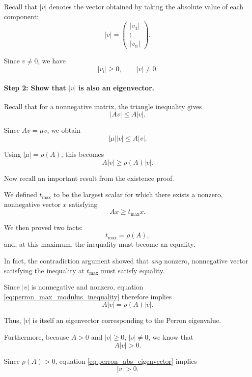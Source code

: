 \documentclass[11pt,a4paper]{article}
\theoremstyle{definition}
\theoremstyle{remark}
\begin{document}
Recall that $|v|$ denotes the vector
obtained by taking the absolute value
of each component:
\[
|v|=
\begin{pmatrix}
|v_1|\\
\vdots\\
|v_n|
\end{pmatrix}.
\]

Since $v\neq0$, we have
\[
|v_i|\geq0,
\qquad
|v|\neq0.
\]


\paragraph{Step 2: Show that $|v|$
is also an eigenvector.}

Recall that for a nonnegative matrix,
the triangle inequality gives
\[
|Av|\leq A|v|.
\]

Since $Av=\mu v$, we obtain
\[
|\mu||v|\leq A|v|.
\]

Using $|\mu|=\rho(A)$,
this becomes
\begin{equation}
A|v|\geq\rho(A)|v|.
\label{eq:perron_max_modulus_inequality}
\end{equation}

Now recall an important result
from the existence proof.

We defined $t_{\max}$ to be the
largest scalar for which there exists
a nonzero, nonnegative vector $x$
satisfying
\[
Ax\geq t_{\max}x.
\]

We then proved two facts:
\[
t_{\max}=\rho(A),
\]
and, at this maximum, the inequality
must become an equality.

In fact, the contradiction argument
showed that \emph{any} nonzero,
nonnegative vector satisfying the
inequality at $t_{\max}$ must
satisfy equality.

Since $|v|$ is nonnegative and
nonzero, equation
\eqref{eq:perron_max_modulus_inequality}
therefore implies
\begin{equation}
\boxed{
A|v|=\rho(A)|v|.
}
\label{eq:perron_abs_eigenvector}
\end{equation}

Thus, $|v|$ is itself an eigenvector
corresponding to the Perron eigenvalue.

Furthermore, because $A>0$ and
$|v|\geq0$, $|v|\neq0$, we know that
\[
A|v|>0.
\]

Since $\rho(A)>0$, equation
\eqref{eq:perron_abs_eigenvector}
implies
\begin{equation}
|v|>0.
\label{eq:perron_nonzero_components}
\end{equation}
\end{document}
